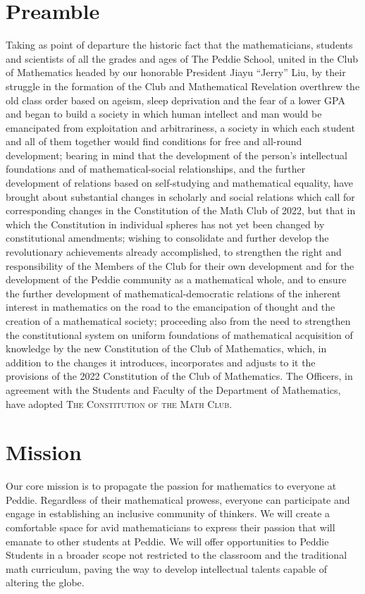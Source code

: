 \documentclass[12pt, letterpaper]{article}
\begin{document}
\section*{Preamble}
Taking as point of departure the historic fact that the mathematicians, students and scientists of all the grades and ages of The Peddie School, united in the Club of Mathematics headed by our honorable President Jiayu “Jerry” Liu, by their struggle in the formation of the Club and Mathematical Revelation overthrew the old class order based on ageism, sleep deprivation and the fear of a lower GPA and began to build a society in which human intellect and man would be emancipated from exploitation and arbitrariness, a society in which each student and all of them together would find conditions for free and all-round development; bearing in mind that the development of the person’s intellectual foundations and of mathematical-social relationships, and the further development of relations based on self-studying and mathematical equality, have brought about substantial changes in scholarly and social relations which call for corresponding changes in the Constitution of the Math Club of 2022, but that in which the Constitution in individual spheres has not yet been changed by constitutional amendments; wishing to consolidate and further develop the revolutionary achievements already accomplished, to strengthen the right and responsibility of the Members of the Club for their own development and for the development of the Peddie community as a mathematical whole, and to ensure the further development of mathematical-democratic relations of the inherent interest in mathematics on the road to the emancipation of thought and the creation of a mathematical society; proceeding also from the need to strengthen the constitutional system on uniform foundations of mathematical acquisition of knowledge by the new Constitution of the Club of Mathematics, which, in addition to the changes it introduces, incorporates and adjusts to it the provisions of the 2022 Constitution of the Club of Mathematics. The Officers, in agreement with the Students and Faculty of the Department of Mathematics, have adopted \textsc{\large The Constitution of the Math Club}.

\section{Mission}
Our core mission is to propagate the passion for mathematics to everyone at Peddie. Regardless of their mathematical prowess, everyone can participate and engage in establishing an inclusive community of thinkers. We will create a comfortable space for avid mathematicians to express their passion that will emanate to other students at Peddie. We will offer opportunities to Peddie Students in a broader scope not restricted to the classroom and the traditional math curriculum, paving the way to develop intellectual talents capable of altering the globe. 
\end{document}
